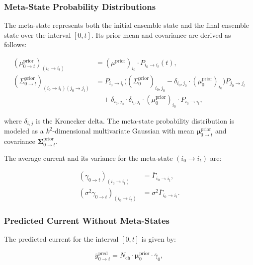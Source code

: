 \documentclass[pdflatex,sn-mathphys-num]{sn-jnl}%
\theoremstyle{thmstyleone}%
\theoremstyle{thmstyletwo}%
\theoremstyle{thmstylethree}%
\begin{document}
\subsubsection{Meta-State Probability Distributions}

The meta-state represents both the initial ensemble state and the final ensemble state over the interval \([0, t]\). Its prior mean and covariance are derived as follows:

\begin{align}
	(\mu^{\text{prior}}_{0 \rightarrow t})_{(i_0 \rightarrow i_t)} &= (\mu^{\text{prior}})_{i_0} \cdot P_{i_0 \rightarrow i_t}(t), \label{eq:meta_mean_prior} \\
	(\Sigma^{\text{prior}}_{0 \rightarrow t})_{(i_0 \rightarrow i_t)(j_0 \rightarrow j_t)} &= 
	P_{i_0 \rightarrow i_t} \big( (\Sigma^{\text{prior}}_0)_{i_0, j_0} - \delta_{i_0, j_0} \cdot (\mu^{\text{prior}}_0)_{i_0} \big) P_{j_0 \rightarrow j_t} \nonumber \\
	&\quad + \delta_{i_0, j_0} \cdot \delta_{i_t, j_t} \cdot (\mu^{\text{prior}}_0)_{i_0} \cdot P_{i_0 \rightarrow i_t}, \label{eq:meta_covariance_prior}
\end{align}

where \( \delta_{i, j} \) is the Kronecker delta. The meta-state probability distribution is modeled as a \( k^2 \)-dimensional multivariate Gaussian with mean \( \boldsymbol{\mu}^{\text{prior}}_{0 \rightarrow t} \) and covariance \( \boldsymbol{\Sigma}^{\text{prior}}_{0 \rightarrow t} \).

The average current and its variance for the meta-state \((i_0 \rightarrow i_t)\) are:

\begin{align}
	(\gamma_{0 \rightarrow t})_{(i_0 \rightarrow i_t)} &= \overline{\Gamma}_{i_0 \rightarrow i_t}, \label{eq:meta_gamma_prior} \\
	(\sigma^2 \gamma_{0 \rightarrow t})_{(i_0 \rightarrow i_t)} &= \sigma^2 \overline{\Gamma}_{i_0 \rightarrow i_t}. \label{eq:meta_sigma_gamma_prior}
\end{align}

\subsubsection{Predicted Current Without Meta-States}

The predicted current for the interval \([0, t]\) is given by:

\begin{equation}
	\overline{y}^{\text{pred}}_{0 \rightarrow t} = N_{\text{ch}} \cdot \mathbf{\mu}^{\text{prior}}_0 \cdot \overline{\gamma}_0,
	\label{eq:macro_interval_predicted_y}
\end{equation}
\end{document}
